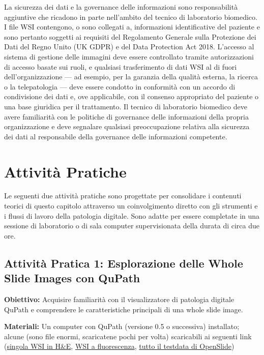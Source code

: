 La sicurezza dei dati e la governance delle informazioni sono responsabilità aggiuntive che ricadono in parte nell'ambito del tecnico di laboratorio biomedico. I file WSI contengono, o sono collegati a, informazioni identificative del paziente e sono pertanto soggetti ai requisiti del Regolamento Generale sulla Protezione dei Dati del Regno Unito (UK GDPR) e del Data Protection Act 2018. L'accesso al sistema di gestione delle immagini deve essere controllato tramite autorizzazioni di accesso basate sui ruoli, e qualsiasi trasferimento di dati WSI al di fuori dell'organizzazione --- ad esempio, per la garanzia della qualità esterna, la ricerca o la telepatologia --- deve essere condotto in conformità con un accordo di condivisione dei dati e, ove applicabile, con il consenso appropriato del paziente o una base giuridica per il trattamento. Il tecnico di laboratorio biomedico deve avere familiarità con le politiche di governance delle informazioni della propria organizzazione e deve segnalare qualsiasi preoccupazione relativa alla sicurezza dei dati al responsabile della governance delle informazioni competente.

\section{Attività Pratiche}

Le seguenti due attività pratiche sono progettate per consolidare i contenuti teorici di questo capitolo attraverso un coinvolgimento diretto con gli strumenti e i flussi di lavoro della patologia digitale. Sono adatte per essere completate in una sessione di laboratorio o di sala computer supervisionata della durata di circa due ore.

\subsection*{Attività Pratica 1: Esplorazione delle Whole Slide Images con QuPath}

\textbf{Obiettivo:} Acquisire familiarità con il visualizzatore di patologia digitale QuPath e comprendere le caratteristiche principali di una whole slide image.

\textbf{Materiali:} Un computer con QuPath (versione 0.5 o successiva) installato; alcune (sono file enormi, scaricatene pochi per volta) scaricabili ai seguenti link (\href{https://openslide.cs.cmu.edu/download/openslide-testdata/Aperio/CMU-1.svs}{singola WSI in H\&E}, \href{https://zenodo.org/records/18302140}{WSI a fluorescenza}, \href{https://openslide.cs.cmu.edu/download/openslide-testdata/}{tutto il testdata di OpenSlide})


